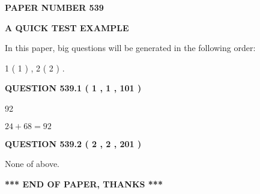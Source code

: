 \documentclass[12pt]{article}
\begin{document}
   
\newpage 
\setcounter{page}{ 
   539001 } 
   
   
   
   
 {\textbf{ \Large{ PAPER NUMBER  539  }}}
   
   
\vspace{0.2in}
   
   
   
   
   
   
 \vspace{0.2in}
{\LARGE {\textbf{ A QUICK TEST EXAMPLE}}}
   
   
   
\vspace{0.2in}
   
In this paper, big questions will be generated in the following order: 
   
   
   1 ( 1 )
 ,
   2 ( 2 )
 .
  
\vspace{0.2in}
  
{\textbf{\Large{QUESTION
539.1 
 ( 1 , 1 , 101 )
}}}
  
  
 
 
\noindent{}

92
 
 
 
 
\noindent{}

$ %
24 +  %
68=   %
92$
 
 
  
\vspace{0.2in}
  
{\textbf{\Large{QUESTION
539.2 
 ( 2 , 2 , 201 )
}}}
  
  
 
 
\noindent{}
 
 
 None of above.
 
 
 
 
   
   
 \vspace{0.2in}
 
   
   
   
   
\vspace{1.0in} 
{\textbf{\large{ *** END OF PAPER, THANKS *** }}} 
   
\end{document}
